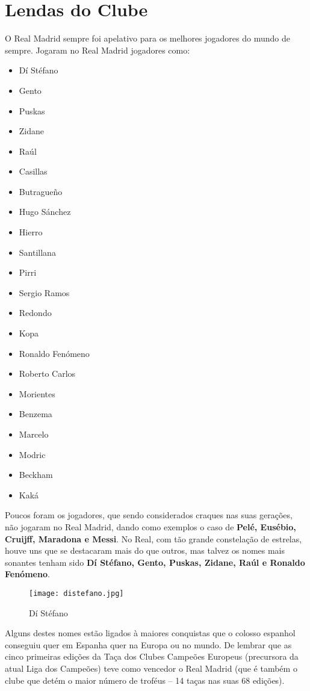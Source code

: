 \documentclass{report}
\begin{document}
\chapter{Lendas do Clube}
\label{chap.lendas}
O Real Madrid sempre foi apelativo para os melhores jogadores do mundo de sempre. Jogaram no Real Madrid jogadores como: 
\begin{itemize}
    \item Dí Stéfano
    \item Gento
    \item Puskas
    \item Zidane
    \item Raúl
    \item Casillas
    \item Butragueño
    \item Hugo Sánchez
    \item Hierro
    \item Santillana
    \item Pirri
    \item Sergio Ramos
    \item Redondo
    \item Kopa
    \item Ronaldo Fenómeno
    \item Roberto Carlos
    \item Morientes
    \item Benzema
    \item Marcelo
    \item Modric
    \item Beckham
    \item Kaká
\end{itemize}
Poucos foram os jogadores, que sendo considerados craques nas suas gerações, não jogaram no Real Madrid, dando como exemplos o caso de \textbf{Pelé, Eusébio, Cruijff, Maradona e Messi}.
No Real, com tão grande constelação de estrelas, houve uns que se destacaram mais do que outros, mas talvez os nomes mais sonantes tenham sido \textbf{Dí Stéfano, Gento, Puskas, Zidane, Raúl e Ronaldo Fenómeno}.
\begin{figure}[h]
    \centering
    \texttt{[image: distefano.jpg]}
    \caption{Dí Stéfano}
    \label{fig:distefano}
\end{figure}
Alguns destes nomes estão ligados à maiores conquistas que o colosso espanhol conseguiu quer em Espanha quer na Europa ou no mundo. De lembrar que as cinco primeiras edições da Taça dos Clubes Campeões Europeus (precursora da atual Liga dos Campeões) teve como vencedor o Real Madrid (que é também o clube que detém o maior número de troféus – 14 taças nas suas 68 edições).
\end{document}
